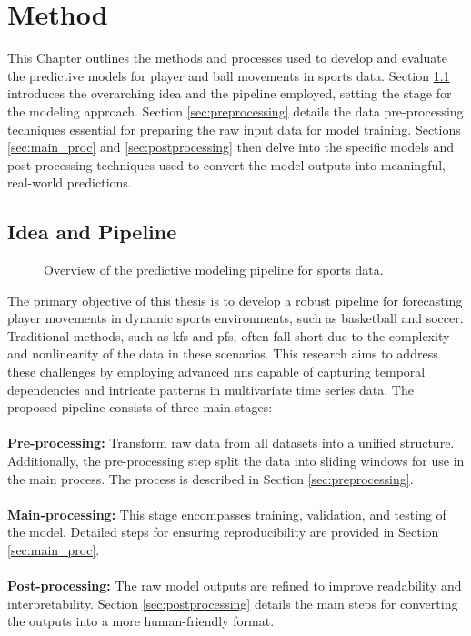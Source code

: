 \chapter{Method}
\label{chapt:method}

This Chapter outlines the methods and processes used to develop and evaluate the predictive models for player and ball movements in sports data. Section \ref{sec:idea_pipeline} introduces the overarching idea and the pipeline employed, setting the stage for the modeling approach. Section \ref{sec:preprocessing} details the data pre-processing techniques essential for preparing the raw input data for model training. Sections \ref{sec:main_proc} and \ref{sec:postprocessing} then delve into the specific models and post-processing techniques used to convert the model outputs into meaningful, real-world predictions.

\section{Idea and Pipeline}
\label{sec:idea_pipeline}
\begin{figure}[H]
    \centering
    
    \caption{Overview of the predictive modeling pipeline for sports data.}
    \label{fig:pipeline}
\end{figure}
The primary objective of this thesis is to develop a robust pipeline for forecasting player movements in dynamic sports environments, such as basketball and soccer. Traditional methods, such as \glspl{kf} and \glspl{pf}, often fall short due to the complexity and nonlinearity of the data in these scenarios. This research aims to address these challenges by employing advanced \glspl{nn} capable of capturing temporal dependencies and intricate patterns in multivariate time series data. The proposed pipeline consists of three main stages:
\\ \\
\textbf{Pre-processing:} Transform raw data from all datasets into a unified structure. Additionally, the pre-processing step split the data into sliding windows for use in the main process. The process is described in Section \ref{sec:preprocessing}.
\\ \\
\textbf{Main-processing:} This stage encompasses training, validation, and testing of the model. Detailed steps for ensuring reproducibility are provided in Section \ref{sec:main_proc}.
\\ \\
\textbf{Post-processing:} The raw model outputs are refined to improve readability and interpretability. Section \ref{sec:postprocessing} details the main steps for converting the outputs into a more human-friendly format.

